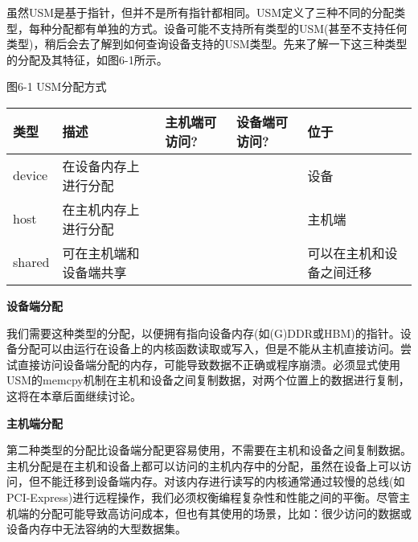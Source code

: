 虽然USM是基于指针，但并不是所有指针都相同。USM定义了三种不同的分配类型，每种分配都有单独的方式。设备可能不支持所有类型的USM(甚至不支持任何类型)，稍后会去了解到如何查询设备支持的USM类型。先来了解一下这三种类型的分配及其特征，如图6-1所示。\par

\hspace*{\fill} \par %
图6-1 USM分配方式
\begin{table}[H]
	\begin{tabular}{|l|l|l|l|l|}
		\hline
		类型   & 描述                                & 主机端可访问? & 设备端可访问? & 位于                          \\ \hline
		device & 在设备内存上进行分配              & \XSolidBrush                   & \Checkmark                      & 设备                              \\ \hline
		host   & 在主机内存上进行分配                 & \Checkmark                   & \Checkmark                     & 主机端                                \\ \hline
		shared & 可在主机端和设备端共享 & \Checkmark                    & \Checkmark                     & 可以在主机和设备之间迁移 \\ \hline
	\end{tabular}
\end{table}

\hspace*{\fill} \par %
\textbf{设备端分配}

我们需要这种类型的分配，以便拥有指向设备内存(如(G)DDR或HBM)的指针。设备分配可以由运行在设备上的内核函数读取或写入，但是不能从主机直接访问。尝试直接访问设备端分配的内存，可能导致数据不正确或程序崩溃。必须显式使用USM的memcpy机制在主机和设备之间复制数据，对两个位置上的数据进行复制，这将在本章后面继续讨论。\par

\hspace*{\fill} \par %
\textbf{主机端分配}

第二种类型的分配比设备端分配更容易使用，不需要在主机和设备之间复制数据。主机分配是在主机和设备上都可以访问的主机内存中的分配，虽然在设备上可以访问，但不能迁移到设备端内存。对该内存进行读写的内核通常通过较慢的总线(如PCI-Express)进行远程操作，我们必须权衡编程复杂性和性能之间的平衡。尽管主机端的分配可能导致高访问成本，但也有其使用的场景，比如：很少访问的数据或设备内存中无法容纳的大型数据集。\par


